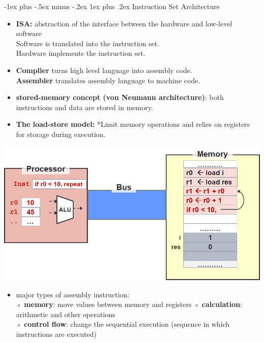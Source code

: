 \documentclass[12pt, landscape]{article}
\makeatletter
\renewcommand{\subsubsection}{\@startsection{subsubsection}{3}{0mm}%
                                {-1ex plus -.5ex minus -.2ex}%
                                {1ex plus .2ex}%
                                {\normalfont\small\bfseries}}
\makeatother
\begin{document}
\begin{multicols*}{3}
\subsubsection{Instruction Set Architecture}
\begin{itemize}
\item \textbf{ISA:} abstraction of the interface between the hardware and low-level
software \\
Software is translated into the instruction set. \\
Hardware implements the instruction set.
\item \textbf{Complier} turns high level language into assembly code. \\
\textbf{Assembler} translates assembly language to machine code.
\item \textbf{stored-memory concept (von Neumann architecture)}: both instructions and data are stored in
memory.
\item \textbf{The load-store model:} *Limit memory operations and relies on registers for storage during execution.
\end{itemize}
\centerline{\includegraphics[width=0.8\linewidth]{isa1}}
\begin{itemize}
\item major types of assembly instruction: \\
◦ \textbf{memory}: move values between memory and registers
◦ \textbf{calculation}: arithmetic and other operations \\
◦ \textbf{control flow}: change the sequential execution (sequence in which
instructions are executed)
\end{itemize}


\end{multicols*}
\end{document}
